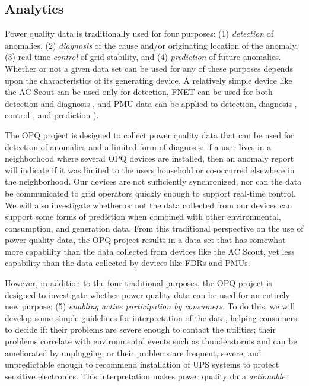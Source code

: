 \subsection{Analytics}

Power quality data is traditionally used for four purposes: (1) {\em detection} of anomalies, (2) {\em diagnosis} of the cause and/or originating location of the anomaly, (3) real-time {\em control} of grid stability, and (4) {\em prediction} of future anomalies. Whether or not a given data set can be used for any of these purposes depends upon the characteristics of its generating device. A relatively simple device like the AC Scout can be used only for detection, FNET can be used for both detection and diagnosis \cite{Markham2012}, and PMU data can be applied to detection, diagnosis \cite{Zhao2009}, control \cite{Liu2010}, and prediction \cite{Liu2009,Gao2012}). 

The OPQ project is designed to collect power quality data that can be used for detection of anomalies and a limited form of diagnosis: if a user lives in a neighborhood where several OPQ devices are installed, then an anomaly report will indicate if it was limited to the users household or co-occurred elsewhere in the neighborhood. Our devices are not sufficiently synchronized, nor can the data be communicated to grid operators quickly enough to support real-time control. We will also investigate whether or not the data collected from our devices can support some forms of prediction when combined with other environmental, consumption, and generation data. From this traditional perspective on the use of power quality data, the OPQ project results in a data set that has somewhat more capability than the data collected from devices like the AC Scout, yet less capability than the data collected by devices like FDRs and PMUs. 

However, in addition to the four traditional purposes, the OPQ project is designed to investigate whether power quality data can be used for an entirely new purpose: (5) {\em enabling active participation by consumers}. To do this, we will develop some simple guidelines for interpretation of the data, helping consumers to decide if: their problems are severe enough to contact the utilities; their problems correlate with environmental events such as thunderstorms and can be ameliorated by unplugging; or their problems are frequent, severe, and unpredictable enough to recommend installation of UPS systems to protect sensitive electronics.  This interpretation makes power quality data {\em actionable}.

